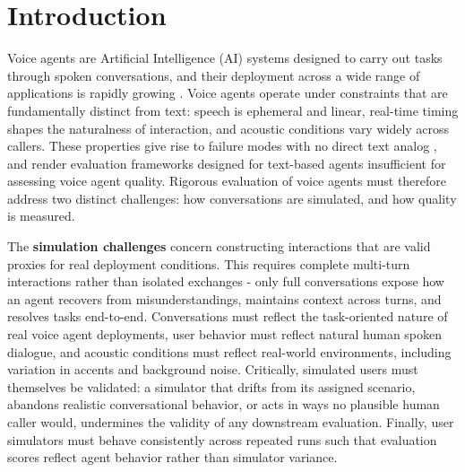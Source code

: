 \section{Introduction}
\label{sec:intro}

Voice agents are Artificial Intelligence (AI) systems designed to carry out tasks through spoken conversations, and their deployment across a wide range of applications is rapidly growing \cite{moore2025voiceagents}. Voice agents operate under constraints that are fundamentally distinct from text: speech is ephemeral and linear, real-time timing shapes the naturalness of interaction, and acoustic conditions vary widely across callers. These properties give rise to failure modes with no direct text analog \cite{ray2026tauvoicebenchmarkingfullduplexvoice,chen2024voicebench}, and render evaluation frameworks designed for text-based agents \cite{yao2024tau, toolbench2023, patil2025bfcl} insufficient for assessing voice agent quality. Rigorous evaluation of voice agents must therefore address two distinct challenges: how conversations are simulated, and how quality is measured.


The \textbf{simulation challenges} concern constructing interactions that are valid proxies for real deployment conditions. This requires complete multi-turn interactions rather than isolated exchanges - only full conversations expose how an agent recovers from misunderstandings, maintains context across turns, and resolves tasks end-to-end. Conversations must reflect the task-oriented nature of real voice agent deployments, user behavior must reflect natural human spoken dialogue, and acoustic conditions must reflect real-world environments, including variation in accents and background noise. Critically, simulated users must themselves be validated: a simulator that drifts from its assigned scenario, abandons realistic conversational behavior, or acts in ways no plausible human caller would, undermines the validity of any downstream evaluation. Finally, user simulators must behave consistently across repeated runs such that evaluation scores reflect agent behavior rather than simulator variance.


